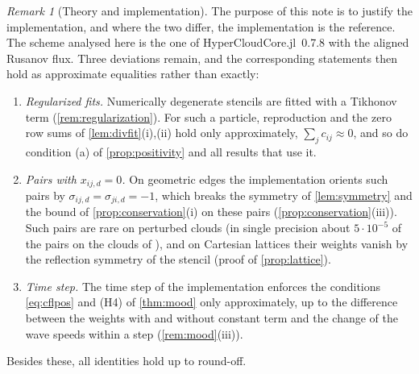 \documentclass[11pt,a4paper]{article}
\theoremstyle{plain}
\theoremstyle{definition}
\theoremstyle{remark}
\newtheorem{remark}[theorem]{Remark}
\numberwithin{equation}{section}
\begin{document}
\begin{remark}[Theory and implementation]\label{rem:code}
The purpose of this note is to justify the implementation, and where the two differ, the implementation is the reference. The scheme analysed here is the one of HyperCloudCore.jl~0.7.8 with the aligned Rusanov flux. Three deviations remain, and the corresponding statements then hold as approximate equalities rather than exactly:
\begin{enumerate}[label=(\roman*)]
\item \emph{Regularized fits.} Numerically degenerate stencils are fitted with a Tikhonov term (\cref{rem:regularization}). For such a particle, reproduction and the zero row sums of \cref{lem:divfit}(i),(ii) hold only approximately, $\sum_jc_{ij}\approx0$, and so do condition (a) of \cref{prop:positivity} and all results that use it.
\item \emph{Pairs with $x_{ij,d}=0$.} On geometric edges the implementation orients such pairs by $\sigma_{ij,d}=\sigma_{ji,d}=-1$, which breaks the symmetry of \cref{lem:symmetry} and the bound of \cref{prop:conservation}(i) on these pairs (\cref{prop:conservation}(iii)). Such pairs are rare on perturbed clouds (in single precision about $5\cdot10^{-5}$ of the pairs on the clouds of \cite{JungMUSCL2026}), and on Cartesian lattices their weights vanish by the reflection symmetry of the stencil (proof of \cref{prop:lattice}).
\item \emph{Time step.} The time step of the implementation enforces the conditions \eqref{eq:cflpos} and (H4) of \cref{thm:mood} only approximately, up to the difference between the weights with and without constant term and the change of the wave speeds within a step (\cref{rem:mood}(iii)).
\end{enumerate}
Besides these, all identities hold up to round-off.
\end{remark}
\end{document}
